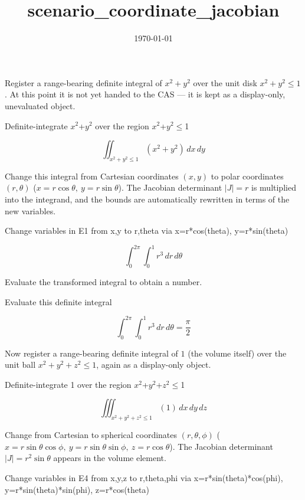 \documentclass[dvipdfmx]{article}
\title{scenario\_coordinate\_jacobian}
\date{\today}
\begin{document}
\maketitle

Register a range-bearing definite integral of $x^2+y^2$ over the unit disk $x^2+y^2\le1$. At this point it is not yet handed to the CAS — it is kept as a display-only, unevaluated object.

Definite-integrate $x^2$+$y^2$ over the region $x^2$+$y^2$$\le$1

\begin{equation}
  \iint_{x^2+y^2 \le 1} (x^2+y^2) \, dx \, dy
  \label{eq:E1}
\end{equation}

Change this integral from Cartesian coordinates $(x,y)$ to polar coordinates $(r,\theta)$ ($x=r\cos\theta,\ y=r\sin\theta$). The Jacobian determinant $|J|=r$ is multiplied into the integrand, and the bounds are automatically rewritten in terms of the new variables.

Change variables in E1 from x,y to r,theta via x=r*cos(theta), y=r*sin(theta)

\begin{equation}
  \int_{0}^{2\pi} \int_{0}^{1} r^3 \, dr \, d\theta
  \label{eq:E2}
\end{equation}

Evaluate the transformed integral to obtain a number.

Evaluate this definite integral

\begin{equation}
  \int_{0}^{2\pi} \int_{0}^{1} r^3 \, dr \, d\theta = \frac{\pi}{2}
  \label{eq:E3}
\end{equation}

Now register a range-bearing definite integral of $1$ (the volume itself) over the unit ball $x^2+y^2+z^2\le1$, again as a display-only object.

Definite-integrate 1 over the region $x^2$+$y^2$+$z^2$$\le$1

\begin{equation}
  \iiint_{x^2+y^2+z^2 \le 1} (1) \, dx \, dy \, dz
  \label{eq:E4}
\end{equation}

Change from Cartesian to spherical coordinates $(r,\theta,\phi)$ ($x=r\sin\theta\cos\phi,\ y=r\sin\theta\sin\phi,\ z=r\cos\theta$). The Jacobian determinant $|J|=r^2\sin\theta$ appears in the volume element.

Change variables in E4 from x,y,z to r,theta,phi via x=r*sin(theta)*cos(phi), y=r*sin(theta)*sin(phi), z=r*cos(theta)
\end{document}

